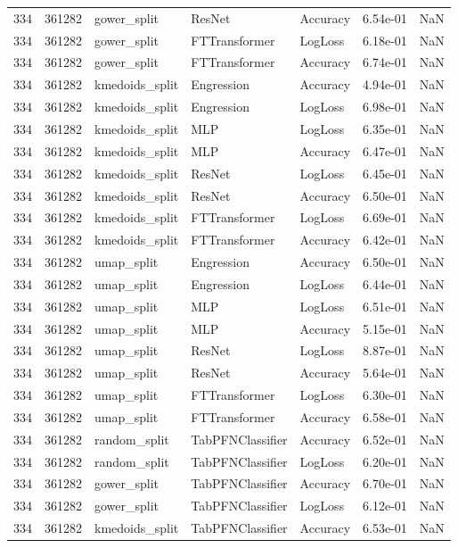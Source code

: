 \begin{tabular}{rrlllrr}
334 & 361282 & gower\_split & ResNet & Accuracy & 6.54e-01 & NaN \\
334 & 361282 & gower\_split & FTTransformer & LogLoss & 6.18e-01 & NaN \\
334 & 361282 & gower\_split & FTTransformer & Accuracy & 6.74e-01 & NaN \\
334 & 361282 & kmedoids\_split & Engression & Accuracy & 4.94e-01 & NaN \\
334 & 361282 & kmedoids\_split & Engression & LogLoss & 6.98e-01 & NaN \\
334 & 361282 & kmedoids\_split & MLP & LogLoss & 6.35e-01 & NaN \\
334 & 361282 & kmedoids\_split & MLP & Accuracy & 6.47e-01 & NaN \\
334 & 361282 & kmedoids\_split & ResNet & LogLoss & 6.45e-01 & NaN \\
334 & 361282 & kmedoids\_split & ResNet & Accuracy & 6.50e-01 & NaN \\
334 & 361282 & kmedoids\_split & FTTransformer & LogLoss & 6.69e-01 & NaN \\
334 & 361282 & kmedoids\_split & FTTransformer & Accuracy & 6.42e-01 & NaN \\
334 & 361282 & umap\_split & Engression & Accuracy & 6.50e-01 & NaN \\
334 & 361282 & umap\_split & Engression & LogLoss & 6.44e-01 & NaN \\
334 & 361282 & umap\_split & MLP & LogLoss & 6.51e-01 & NaN \\
334 & 361282 & umap\_split & MLP & Accuracy & 5.15e-01 & NaN \\
334 & 361282 & umap\_split & ResNet & LogLoss & 8.87e-01 & NaN \\
334 & 361282 & umap\_split & ResNet & Accuracy & 5.64e-01 & NaN \\
334 & 361282 & umap\_split & FTTransformer & LogLoss & 6.30e-01 & NaN \\
334 & 361282 & umap\_split & FTTransformer & Accuracy & 6.58e-01 & NaN \\
334 & 361282 & random\_split & TabPFNClassifier & Accuracy & 6.52e-01 & NaN \\
334 & 361282 & random\_split & TabPFNClassifier & LogLoss & 6.20e-01 & NaN \\
334 & 361282 & gower\_split & TabPFNClassifier & Accuracy & 6.70e-01 & NaN \\
334 & 361282 & gower\_split & TabPFNClassifier & LogLoss & 6.12e-01 & NaN \\
334 & 361282 & kmedoids\_split & TabPFNClassifier & Accuracy & 6.53e-01 & NaN \\

\end{tabular}
